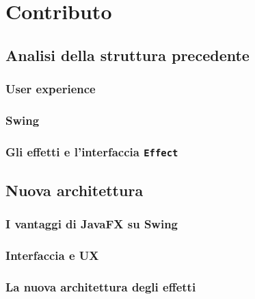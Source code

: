 

\chapter{Contributo}\label{ch:contributo}
\section{Analisi della struttura precedente}\label{sec:analisi}
\subsection{User experience}\label{sub:prevUx}
\subsection{Swing}\label{sub:swing}
\subsection{Gli effetti e l'interfaccia \texttt{Effect}}\label{sub:effect}
\section{Nuova architettura}\label{sec:architettura}
\subsection{I vantaggi di JavaFX su Swing}\label{sub:swingVSjfx}
\subsection{Interfaccia e UX}\label{sub:gui}
\subsection{La nuova architettura degli effetti}\label{sub:nuoviEffetti}
